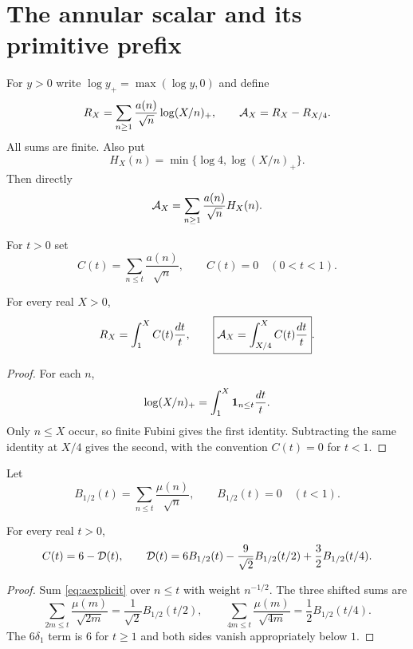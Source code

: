 \section{The annular scalar and its primitive prefix}

For $y>0$ write $\log y_+=\max(\log y,0)$ and define
\[
 R_X=\sum_{n\ge1}\frac{a(n)}{\sqrt n}\log(X/n)_+,
 \qquad
 \mathcal A_X=R_X-R_{X/4}.
\]
All sums are finite.  Also put
\[
 H_X(n)=\min\{\log4,\log(X/n)_+\}.
\]
Then directly
\begin{equation}\label{eq:annular-discrete}
 \mathcal A_X=\sum_{n\ge1}\frac{a(n)}{\sqrt n}H_X(n).
\end{equation}

\begin{definition}
For $t>0$ set
\[
 C(t)=\sum_{n\le t}\frac{a(n)}{\sqrt n},
 \qquad C(t)=0\quad(0<t<1).
\]
\end{definition}

\begin{theorem}\label{thm:window}
For every real $X>0$,
\begin{equation}\label{eq:Rwindow}
 R_X=\int_1^X C(t)\frac{dt}{t},
 \qquad
 \boxed{\mathcal A_X=\int_{X/4}^{X}C(t)\frac{dt}{t}}.
\end{equation}
\end{theorem}
\begin{proof}
For each $n$,
\[
 \log(X/n)_+=\int_1^X\mathbf 1_{n\le t}\frac{dt}{t}.
\]
Only $n\le X$ occur, so finite Fubini gives the first identity.  Subtracting
the same identity at $X/4$ gives the second, with the convention $C(t)=0$ for
$t<1$.
\end{proof}

Let
\[
 B_{1/2}(t)=\sum_{n\le t}\frac{\mu(n)}{\sqrt n},
 \qquad B_{1/2}(t)=0\quad(t<1).
\]

\begin{theorem}\label{thm:C-D}
For every real $t>0$,
\begin{equation}\label{eq:Ddef}
 C(t)=6-\mathcal D(t),
 \qquad
 \mathcal D(t)=6B_{1/2}(t)-\frac9{\sqrt2}B_{1/2}(t/2)
             +\frac32B_{1/2}(t/4).
\end{equation}
\end{theorem}
\begin{proof}
Sum \eqref{eq:aexplicit} over $n\le t$ with weight $n^{-1/2}$.  The three
shifted sums are
\[
 \sum_{2m\le t}\frac{\mu(m)}{\sqrt{2m}}
 =\frac1{\sqrt2}B_{1/2}(t/2),\qquad
 \sum_{4m\le t}\frac{\mu(m)}{\sqrt{4m}}
 =\frac12B_{1/2}(t/4).
\]
The $6\delta_1$ term is $6$ for $t\ge1$ and both sides vanish appropriately
below $1$.
\end{proof}

